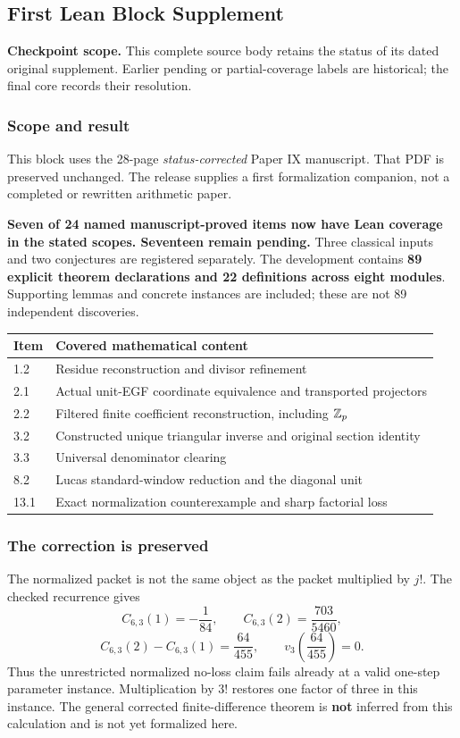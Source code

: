 \clearpage\subsection{First Lean Block Supplement}\label{app:sup1}
\noindent\textbf{Checkpoint scope.} This complete source body retains the status of its dated original supplement. Earlier pending or partial-coverage labels are historical; the final core records their resolution.\par\medskip
\subsubsection*{Scope and result}
This block uses the 28-page \emph{status-corrected} Paper IX manuscript. That PDF is preserved unchanged. The release supplies a first formalization companion, not a completed or rewritten arithmetic paper.

\textbf{Seven of 24 named manuscript-proved items now have Lean coverage in the stated scopes. Seventeen remain pending.} Three classical inputs and two conjectures are registered separately. The development contains \textbf{89 explicit theorem declarations and 22 definitions across eight modules}. Supporting lemmas and concrete instances are included; these are not 89 independent discoveries.

\begin{center}
\begin{tabular}{@{}p{}p{}@{}}
\toprule
Item & Covered mathematical content\\\midrule
1.2 & Residue reconstruction and divisor refinement\\
2.1 & Actual unit-EGF coordinate equivalence and transported projectors\\
2.2 & Filtered finite coefficient reconstruction, including $\mathbb Z_p$\\
3.2 & Constructed unique triangular inverse and original section identity\\
3.3 & Universal denominator clearing\\
8.2 & Lucas standard-window reduction and the diagonal unit\\
13.1 & Exact normalization counterexample and sharp factorial loss\\
\bottomrule
\end{tabular}
\end{center}

\subsubsection*{The correction is preserved}
The normalized packet is not the same object as the packet multiplied by $j!$. The checked recurrence gives
\[
 C_{6,3}(1)=-\frac1{84},\qquad C_{6,3}(2)=\frac{703}{5460},
\]
\[
 C_{6,3}(2)-C_{6,3}(1)=\frac{64}{455},\qquad
 v_3\!\left(\frac{64}{455}\right)=0.
\]
Thus the unrestricted normalized no-loss claim fails already at a valid one-step parameter instance. Multiplication by $3!$ restores one factor of three in this instance. The general corrected finite-difference theorem is \textbf{not} inferred from this calculation and is not yet formalized here.

